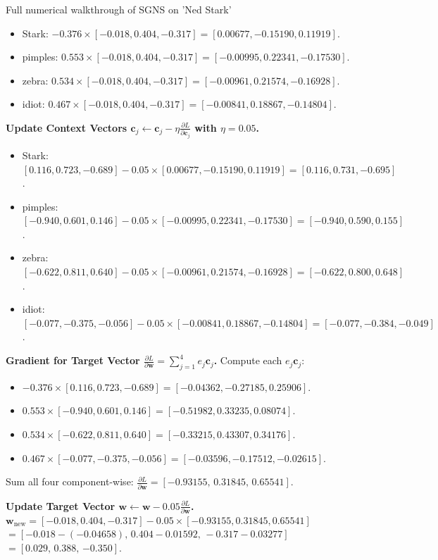\documentclass[a4paper,11pt]{article}
\begin{document}
\begin{worked}{Full numerical walkthrough of SGNS on 'Ned Stark'}
\begin{steps}
        \begin{itemize}
          \item Stark: $-0.376 \times [-0.018, 0.404, -0.317] = [0.00677, -0.15190, 0.11919]$.
          \item pimples: $0.553 \times [-0.018, 0.404, -0.317] = [-0.00995, 0.22341, -0.17530]$.
          \item zebra: $0.534 \times [-0.018, 0.404, -0.317] = [-0.00961, 0.21574, -0.16928]$.
          \item idiot: $0.467 \times [-0.018, 0.404, -0.317] = [-0.00841, 0.18867, -0.14804]$.
        \end{itemize}
  \item \textbf{Update Context Vectors $\mathbf{c}_j \leftarrow \mathbf{c}_j - \eta \frac{\partial L}{\partial \mathbf{c}_j}$ with $\eta = 0.05$.}
        \begin{itemize}
          \item Stark: $[0.116, 0.723, -0.689] - 0.05 \times [0.00677, -0.15190, 0.11919] = [0.116, 0.731, -0.695]$.
          \item pimples: $[-0.940, 0.601, 0.146] - 0.05 \times [-0.00995, 0.22341, -0.17530] = [-0.940, 0.590, 0.155]$.
          \item zebra: $[-0.622, 0.811, 0.640] - 0.05 \times [-0.00961, 0.21574, -0.16928] = [-0.622, 0.800, 0.648]$.
          \item idiot: $[-0.077, -0.375, -0.056] - 0.05 \times [-0.00841, 0.18867, -0.14804] = [-0.077, -0.384, -0.049]$.
        \end{itemize}
  \item \textbf{Gradient for Target Vector $\frac{\partial L}{\partial \mathbf{w}} = \sum_{j=1}^4 e_j \mathbf{c}_j$.}
        Compute each $e_j \mathbf{c}_j$:
        \begin{itemize}
          \item $-0.376 \times [0.116, 0.723, -0.689] = [-0.04362, -0.27185, 0.25906]$.
          \item $0.553 \times [-0.940, 0.601, 0.146] = [-0.51982, 0.33235, 0.08074]$.
          \item $0.534 \times [-0.622, 0.811, 0.640] = [-0.33215, 0.43307, 0.34176]$.
          \item $0.467 \times [-0.077, -0.375, -0.056] = [-0.03596, -0.17512, -0.02615]$.
        \end{itemize}
        Sum all four component-wise:
        $\frac{\partial L}{\partial \mathbf{w}} = [-0.93155,\, 0.31845,\, 0.65541]$.
  \item \textbf{Update Target Vector $\mathbf{w} \leftarrow \mathbf{w} - 0.05 \frac{\partial L}{\partial \mathbf{w}}$.}
        $\mathbf{w}_{\text{new}} = [-0.018, 0.404, -0.317] - 0.05 \times [-0.93155, 0.31845, 0.65541]$ \\
        $= [-0.018 - (-0.04658),\, 0.404 - 0.01592,\, -0.317 - 0.03277]$ \\
        $= [\mathbf{0.029},\, \mathbf{0.388},\, \mathbf{-0.350}]$.
\end{steps}
\end{worked}
\end{document}
